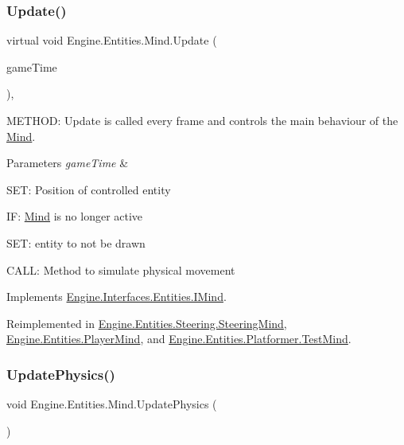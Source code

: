 \subsubsection{\texorpdfstring{Update()}{Update()}}
{\footnotesize\ttfamily virtual void Engine.\+Entities.\+Mind.\+Update (\begin{DoxyParamCaption}\item[{Game\+Time}]{game\+Time }\end{DoxyParamCaption})\hspace{0.3cm}{\ttfamily [inline]}, {\ttfamily [virtual]}}



M\+E\+T\+H\+OD\+: Update is called every frame and controls the main behaviour of the \hyperlink{a00318}{Mind}. 


\begin{DoxyParams}{Parameters}
{\em game\+Time} & \\
\hline
\end{DoxyParams}
S\+ET\+: Position of controlled entity

IF\+: \hyperlink{a00318}{Mind} is no longer active

S\+ET\+: entity to not be drawn

C\+A\+LL\+: Method to simulate physical movement 

Implements \hyperlink{a00446_a21a0486019d7c7b665fdf483626323f3}{Engine.\+Interfaces.\+Entities.\+I\+Mind}.



Reimplemented in \hyperlink{a00346_a2e1f7ec281cfe2b7e8268a93bec59d4a}{Engine.\+Entities.\+Steering.\+Steering\+Mind}, \hyperlink{a00326_a172dca0ea26dfd821b413f7592a98084}{Engine.\+Entities.\+Player\+Mind}, and \hyperlink{a00334_a1817f5df935d637c737d510e39fd251f}{Engine.\+Entities.\+Platformer.\+Test\+Mind}.

\mbox{\label{a00318_afc6609503e3a531416f5080b2114e24a}} 
\subsubsection{\texorpdfstring{Update\+Physics()}{UpdatePhysics()}}
{\footnotesize\ttfamily void Engine.\+Entities.\+Mind.\+Update\+Physics (\begin{DoxyParamCaption}{ }\end{DoxyParamCaption})\hspace{0.3cm}{\ttfamily [inline]}}



